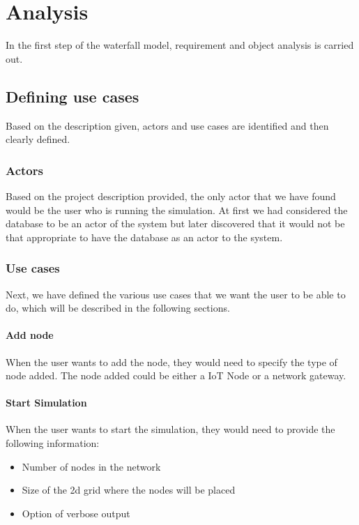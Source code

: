 \chapter{Analysis}\label{ch:Analysis}

In the first step of the waterfall model, requirement and object analysis is carried out.

\section{Defining use cases}
Based on the description given, actors and use cases are identified and then clearly defined.

\subsection{Actors}
Based on the project description provided, the only actor that we have found would be the user who is running the simulation. At first we had considered the database to be an actor of the system but later discovered that it would not be that appropriate to have the database as an actor to the system.

\subsection{Use cases}
Next, we have defined the various use cases that we want the user to be able to do, which will be described in the following sections.

\subsubsection{Add node}
When the user wants to add the node, they would need to specify the type of node added. The node added could be either a IoT Node or a network gateway.

\subsubsection{Start Simulation}
When the user wants to start the simulation, they would need to provide the following information:
\begin{itemize}
    \item Number of nodes in the network 
    \item Size of the 2d grid where the nodes will be placed
    \item Option of verbose output
\end{itemize}

